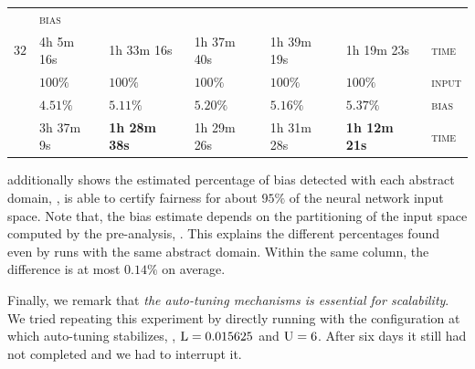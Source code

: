 \begin{table}[t]
{\begin{tabular}{ P{3em}  P{6em}  P{6em}  P{6em}  P{6em} P{6em} P{2.4em} }
    & \textsc{bias} \\
     & 4h 5m 16s & 1h 33m 16s & 1h 37m 40s & 1h 39m 19s & 1h 19m 23s
    & \textsc{time} \\
    \midrule
      & $100\%$ & $100\%$ & $100\%$ & $100\%$ & $100\%$
    & \textsc{input} \\
    & $4.51\%$ & $5.11\%$ & $5.20\%$ & $5.16\%$ & $5.37\%$
    & \textsc{bias} \\
       & 3h 37m 9s & \textbf{1h 28m 38s} & 1h 29m 26s & 1h 31m 28s & \textbf{1h 12m 21s}
    & \textsc{time} \\
    \bottomrule
    \end{tabular}
}
\end{table}

 additionally shows the estimated percentage of bias detected with each abstract domain, \ie, \libra{} is able to certify fairness for about $95\%$ of the neural network input space. Note that, the bias estimate depends on the partitioning of the input space computed by the pre-analysis, \cf{} . This explains the different percentages found even by runs with the same abstract domain. Within the same column, the difference is at most $0.14\%$ on average.



Finally, we remark that \emph{the auto-tuning mechanisms is essential for scalability}. We tried repeating this experiment by directly
running \libra{} with the configuration at which auto-tuning stabilizes, \ie, $\textup{L} = 0.015625$ and $\textup{U} = 6$. After six days it still had not completed and we had to interrupt it.



